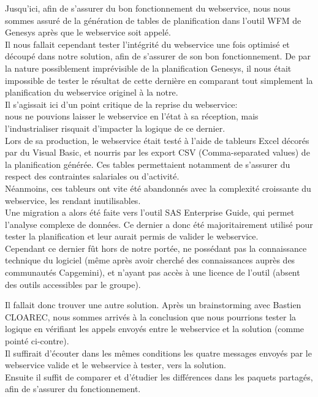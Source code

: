 \documentclass{rapport}
\begin{document}
Jusqu'ici, afin de s'assurer du bon fonctionnement du webservice, nous nous sommes assuré de la génération de tables de planification dans l'outil WFM de Genesys après que le webservice soit appelé.\\
Il nous fallait cependant tester l'intégrité du webservice une fois optimisé et découpé dans notre solution, afin de s'assurer de son bon fonctionnement. De par la nature possiblement imprévisible de la planification Genesys, il nous était impossible de tester le résultat de cette dernière en comparant tout simplement la planification du webservice originel à la notre.\\

Il s'agissait ici d'un point critique de la reprise du webservice:\\
nous ne pouvions laisser le webservice en l'état à sa réception, mais l'industrialiser risquait d'impacter la logique de ce dernier.\\

Lors de sa production, le webservice était testé à l'aide de tableurs Excel décorés par du Visual Basic, et nourris par les export CSV (Comma-separated values) de la planification générée. Ces tables permettaient notamment de s'assurer du respect des contraintes salariales ou d'activité.\\
Néanmoins, ces tableurs ont vite été abandonnés avec la complexité croissante du webservice, les rendant inutilisables.\\
Une migration a alors été faite vers l'outil SAS Enterprise Guide, qui permet l'analyse complexe de données. Ce dernier a donc été majoritairement utilisé pour tester la planification et leur aurait permis de valider le webservice.\\
Cependant ce dernier fût hors de notre portée, ne possédant pas la connaissance technique du logiciel (même après avoir cherché des connaissances auprès des communautés Capgemini), et n'ayant pas accès à une licence de l'outil (absent des outils accessibles par le groupe).\\

\begin{minipage}{0.35\textwidth}
Il fallait donc trouver une autre solution. Après un brainstorming avec Bastien CLOAREC, nous sommes arrivés à la conclusion que nous pourrions tester la logique en vérifiant les appels envoyés entre le webservice et la solution (comme pointé ci-contre).\\

Il suffirait d'écouter dans les mêmes conditions les quatre messages envoyés par le webservice valide et le webservice à tester, vers la solution.\\
Ensuite il suffit de comparer et d'étudier les différences dans les paquets partagés, afin de s'assurer du fonctionnement.\\
\end{minipage}
\begin{minipage}{0.55\textwidth}
\end{minipage}
\vspace{5mm} %
\\
\end{document}
